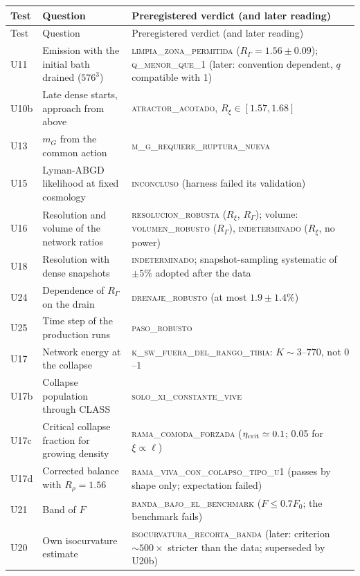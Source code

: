 \documentclass[11pt,a4paper]{article}
\newcommand{\RG}{R_\Gamma}
\newcommand{\Rxi}{R_\xi}
\begin{document}
\begin{small}
\begin{longtable}{L{1.3cm}L{6.0cm}L{7.6cm}}
\toprule
Test & Question & Preregistered verdict (and later reading)\\
\midrule
\endfirsthead
\toprule
Test & Question & Preregistered verdict (and later reading)\\
\midrule
\endhead
\bottomrule
\endfoot
U11 & Emission with the initial bath drained ($576^3$) & \textsc{limpia\_zona\_permitida} ($\RG=1.56\pm0.09$); \textsc{q\_menor\_que\_1} (later: convention dependent, $q$ compatible with 1) \\
U10b & Late dense starts, approach from above & \textsc{atractor\_acotado}, $\Rxi\in[1.57,1.68]$ \\
U13 & $m_G$ from the common action & \textsc{m\_g\_requiere\_ruptura\_nueva} \\
U15 & Lyman-ABGD likelihood at fixed cosmology & \textsc{inconcluso} (harness failed its validation) \\
U16 & Resolution and volume of the network ratios & \textsc{resolucion\_robusta} ($\Rxi$, $\RG$); volume: \textsc{volumen\_robusto} ($\RG$), \textsc{indeterminado} ($\Rxi$, no power) \\
U18 & Resolution with dense snapshots & \textsc{indeterminado}; snapshot-sampling systematic of $\pm5\%$ adopted after the data \\
U24 & Dependence of $\RG$ on the drain & \textsc{drenaje\_robusto} (at most $1.9\pm1.4\%$) \\
U25 & Time step of the production runs & \textsc{paso\_robusto} \\
U17 & Network energy at the collapse & \textsc{k\_sw\_fuera\_del\_rango\_tibia}: $K\sim3$--$770$, not $0$--$1$ \\
U17b & Collapse population through CLASS & \textsc{solo\_xi\_constante\_vive} \\
U17c & Critical collapse fraction for growing density & \textsc{rama\_comoda\_forzada} ($\eta_{\rm crit}\simeq0.1$; 0.05 for $\xi\propto\ell$) \\
U17d & Corrected balance with $R_\rho=1.56$ & \textsc{rama\_viva\_con\_colapso\_tipo\_u1} (passes by shape only; expectation failed) \\
U21 & Band of $F$ & \textsc{banda\_bajo\_el\_benchmark} ($F\le0.7F_0$; the benchmark fails) \\
U20 & Own isocurvature estimate & \textsc{isocurvatura\_recorta\_banda} (later: criterion $\sim500\times$ stricter than the data; superseded by U20b) \\

\end{longtable}
\end{small}
\end{document}
